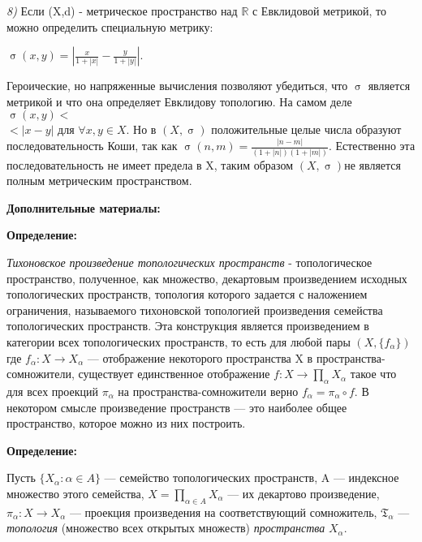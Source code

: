     \par \textit{8)} Если (X,d) - метрическое пространство над $\mathds{R}$ с Евклидовой метрикой, то можно определить специальную метрику:
    \begin{center}
    $\upsigma(x,y)=|\frac{x}{1+|x|}-\frac{y}{1+|y|}|$.
    \end{center} 
   Героические, но напряженные вычисления позволяют убедиться, что $\upsigma$ является метрикой и что она определяет Евклидову топологию.  На самом деле  $\upsigma(x,y)<$\\ $<|x-y|$ для $\forall x,y \in X$. Но в $(X,\upsigma)$ положительные целые числа образуют последовательность Коши, так как $\upsigma(n,m)=\frac{|n-m|}{(1+|n|)(1+|m|)}$. Естественно эта последовательность не имеет предела в X, таким образом $(X,\upsigma)$не является полным метрическим пространством.\\
 \begin{center}
 \textbf{Дополнительные материалы:}\\
 \end{center} 
  \begin{center}
  \textbf{Определение:}\\ 
   \end{center} 
   \textit{Тихоновское произведение топологических пространств} - топологическое пространство, полученное, как множество, декартовым произведением исходных топологических пространств, топология которого задается с наложением ограничения, называемого тихоновской топологией произведения семейства топологических пространств.  Эта конструкция является произведением в категории всех топологических пространств, то есть для любой пары $(X, \{f_\alpha \})$ где $f_\alpha: X\to X_\alpha$ — отображение некоторого пространства X в пространства-сомножители, существует единственное отображение $f : X\to \prod_\alpha X_\alpha$
такое что для всех проекций $\pi_\alpha$ на пространства-сомножители верно $f_\alpha = \pi_\alpha \circ f$. В некотором смысле произведение пространств — это наиболее общее пространство, которое можно из них построить.
   \begin{center}
  \textbf{Определение:}\\ 
   \end{center} 
    Пусть $\{X_{\alpha}: \alpha\in A\}$ — семейство топологических пространств, A — индексное множество этого семейства, $X=\prod\limits_{\alpha\in A}X_{\alpha}$ — их декартово произведение, $\pi_{\alpha}: X\to X_{\alpha}$ — проекция произведения на соответствующий сомножитель, $\mathfrak{T}_{\alpha}$ —   \textit {топология} (множество всех открытых множеств)    \textit{пространства} $X_{\alpha}$.\\
